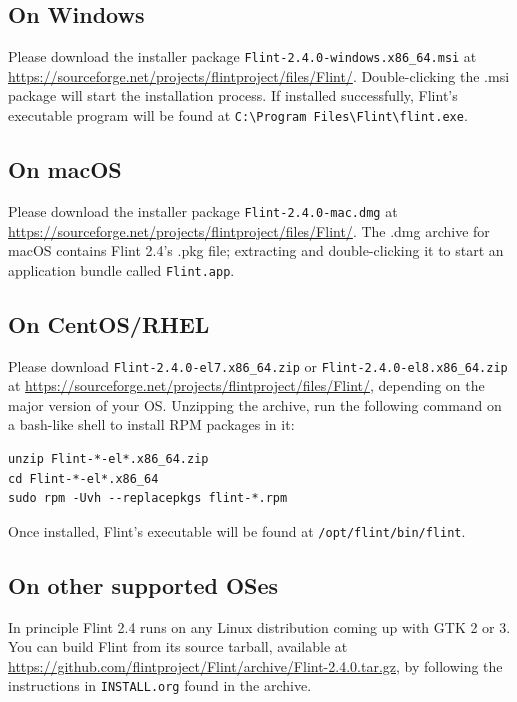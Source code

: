 \documentclass[a4paper,10pt]{report}
\begin{document}
\subsection{On Windows}
\label{sec:org59b85b2}
Please download the installer package \texttt{Flint-2.4.0-windows.x86\_64.msi} at
\url{https://sourceforge.net/projects/flintproject/files/Flint/}.
Double-clicking the .msi package will start the installation process.
If installed successfully, Flint's executable program will be found at
\texttt{C:\textbackslash{}Program Files\textbackslash{}Flint\textbackslash{}flint.exe}.

\subsection{On macOS}
\label{sec:org3fe3629}
Please download the installer package \texttt{Flint-2.4.0-mac.dmg} at
\url{https://sourceforge.net/projects/flintproject/files/Flint/}.
The .dmg archive for macOS contains Flint 2.4's .pkg file; extracting and
double-clicking it to start an application bundle called
\texttt{Flint.app}.

\subsection{On CentOS/RHEL}
\label{sec:org9432fe4}
Please download \texttt{Flint-2.4.0-el7.x86\_64.zip} or \texttt{Flint-2.4.0-el8.x86\_64.zip}
at \url{https://sourceforge.net/projects/flintproject/files/Flint/}, depending
on the major version of your OS.
Unzipping the archive, run the following command on a bash-like shell to install
RPM packages in it:
\begin{verbatim}
unzip Flint-*-el*.x86_64.zip
cd Flint-*-el*.x86_64
sudo rpm -Uvh --replacepkgs flint-*.rpm
\end{verbatim}
Once installed, Flint's executable will be found at
\texttt{/opt/flint/bin/flint}.

\subsection{On other supported OSes}
\label{sec:orgb955bef}
In principle Flint 2.4 runs on any Linux distribution coming up with GTK 2 or 3.
You can build Flint from its source tarball, available at
\url{https://github.com/flintproject/Flint/archive/Flint-2.4.0.tar.gz},
by following the instructions in \texttt{INSTALL.org} found in the archive.
\end{document}

